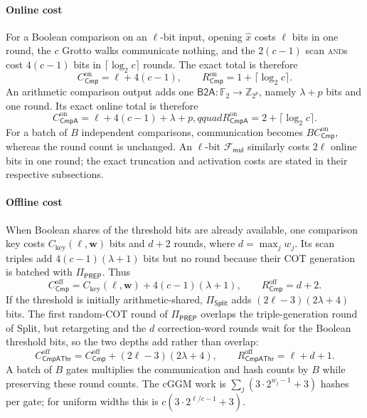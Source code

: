 \documentclass[journal]{IEEEtran}
\theoremstyle{definition}
\theoremstyle{plain}
\newcommand{\Z}{\mathbb{Z}}
\newcommand{\F}{\mathbb{F}}
\newcommand{\Fmul}{\mathcal{F}_{\mathsf{mul}}}
\newcommand{\xhat}{\hat{x}}
\newcommand{\PREP}{\Pi_{\mathsf{PREP}}}
\newcommand{\nseg}{c}                              %
\newcommand{\wseg}{w}                              %
\begin{document}
\paragraph*{Online cost}
For a Boolean comparison on an $\ell$-bit input, opening $\xhat$ costs $\ell$
bits in one round, the $\nseg$ Grotto walks communicate nothing, and the
$2(\nseg-1)$ scan \textsc{and}s cost $4(\nseg-1)$ bits in
$\lceil\log_2\nseg\rceil$ rounds. The exact total is therefore
\begin{equation}
C^{\mathrm{on}}_{\mathsf{Cmp}}=\ell+4(\nseg-1),\qquad
R^{\mathrm{on}}_{\mathsf{Cmp}}=1+\lceil\log_2\nseg\rceil.
\end{equation}
An arithmetic comparison output adds one
$\mathsf{B2A}:\F_2\rightarrow\Z_{2^p}$, namely $\lambda+p$ bits and one round.
Its exact online total is therefore
\begin{equation}
C^{\mathrm{on}}_{\mathsf{CmpA}}=\ell+4(\nseg-1)+\lambda+p,qquad
R^{\mathrm{on}}_{\mathsf{CmpA}}=2+\lceil\log_2\nseg\rceil.
\end{equation}
For a batch of $B$ independent comparisons, communication becomes
$B C^{\mathrm{on}}_{\mathsf{Cmp}}$, whereas the round count is unchanged. An
$\ell$-bit $\Fmul$ similarly costs $2\ell$ online bits in one round; the exact
truncation and activation costs are stated in their respective subsections.

\paragraph*{Offline cost}
When Boolean shares of the threshold bits are already available, one comparison
key costs $C_{\mathrm{key}}(\ell,\boldsymbol{\wseg})$ bits and $d+2$ rounds,
where $d=\max_j\wseg_j$. Its scan triples add
$4(\nseg-1)(\lambda+1)$ bits but no round because their COT generation is
batched with $\PREP$. Thus
\begin{equation}
C^{\mathrm{off}}_{\mathsf{Cmp}}
=C_{\mathrm{key}}(\ell,\boldsymbol{\wseg})
 +4(\nseg-1)(\lambda+1),\qquad
R^{\mathrm{off}}_{\mathsf{Cmp}}=d+2.
\end{equation}
If the threshold is initially arithmetic-shared, $\Pi_{\mathsf{Split}}$ adds
$(2\ell-3)(2\lambda+4)$ bits. The first random-COT round of $\PREP$ overlaps
the triple-generation round of Split, but retargeting and the $d$
correction-word rounds wait for the Boolean threshold bits, so the two depths
add rather than overlap:
\begin{equation}
C^{\mathrm{off}}_{\mathsf{CmpAThr}}
=C^{\mathrm{off}}_{\mathsf{Cmp}}+(2\ell-3)(2\lambda+4),\qquad
R^{\mathrm{off}}_{\mathsf{CmpAThr}}=\ell+d+1.
\end{equation}
A batch of $B$ gates multiplies the communication and hash counts by $B$ while
preserving these round counts. The cGGM work is
$\sum_j(3\cdot2^{\wseg_j-1}+3)$ hashes per gate; for uniform widths this is
$\nseg(3\cdot2^{\ell/\nseg-1}+3)$.
\end{document}
